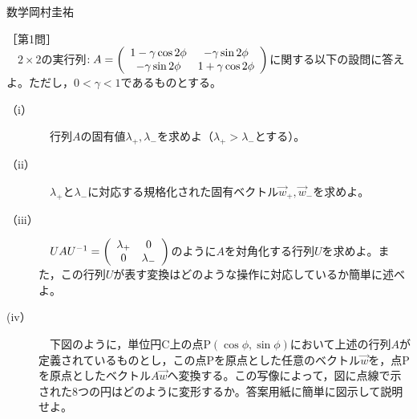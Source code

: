 \documentclass[fleqn]{jbook}
\def\t{\times}
\def\lam#1{\lambda_{#1}}
\def\w#1{\vec{w}_{#1}}
\begin{document}

\begin{question}{数学}{岡村圭祐}
\setcounter{equation}{0}

［第1問］\\
　$2\t 2$の実行列$:A =
     \left( {\begin{array}{*{20}c}
   {1 - \gamma \cos 2\phi } & { - \gamma \sin 2\phi }  \\
   { - \gamma \sin 2\phi } & {1 + \gamma \cos 2\phi }  \\
     \end{array}} \right)$に関する以下の設問に答えよ。ただし，$0<\gamma<1$であるものとする。\\
     
    \begin{description}
        \item[{\rm （i）}] 　行列$A$の固有値$\lam+,\lam-$を求めよ（$\lam+>\lam-$とする）。\\
        
        \item[{\rm （ii）}] 　$\lam+$と$\lam-$に対応する規格化された固有ベクトル$\w+,\w-$を求めよ。\\
        
        \item[{\rm （iii）}] 　$UAU^{-1}=
        \left( {\begin{array}{*{20}c}
   {\lam+} & {0}  \\
   {0} & {\lam-}  \\
     \end{array}} \right)$のように$A$を対角化する行列$U$を求めよ。また，この行列$U$が表す変換はどのような操作に対応しているか簡単に述べよ。\\
     
        \item[{\rm (iv）}] 　下図のように，単位円C上の点P$(\cos\phi,\sin\phi)$において上述の行列$A$が定義されているものとし，この点Pを原点とした任意のベクトル$\vec{w}$を，点Pを原点としたベクトル$A\vec{w}$へ変換する。この写像によって，図に点線で示された8つの円はどのように変形するか。答案用紙に簡単に図示して説明せよ。\\

\begin{figure}[hbtp]
\begin{center}
\vspace{1.0cm}

\end{center}
\end{figure}


\end{description}
\end{question}
\end{document}
